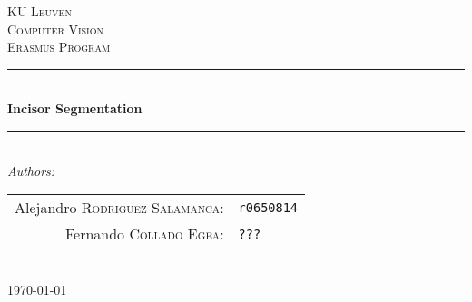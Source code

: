 \begin{titlepage}

\newcommand{\HRule}{\rule{\linewidth}{0.5mm}} %

\center %


\textsc{\LARGE KU Leuven}\\[3.5cm] %
\textsc{\Large Computer Vision}\\[0.5cm] %
\textsc{\large Erasmus Program}\\[2.5cm] %


\HRule \\[0.4cm]
{ \huge \bfseries Incisor Segmentation}\\[0.4cm] %
\HRule \\[5.5cm]



\emph{Authors:}\\[0.7cm]

\begin{tabular}{rl}
    Alejandro \textsc{Rodriguez Salamanca}: &\texttt{r0650814}\\
    Fernando \textsc{Collado Egea}: &\texttt{???}\\

\end{tabular}\\[2cm]



{\large \today}\\[3cm] %


\end{titlepage}
